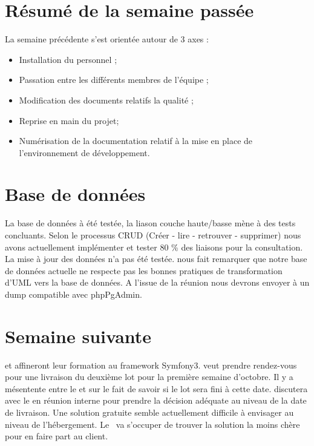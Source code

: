 \documentclass [a4paper] {article}
\begin{document}
\section{Résumé de la semaine passée}
La semaine précédente s'est orientée autour de 3 axes :  
\begin{itemize}
\item Installation du personnel ;
\item Passation entre les différents membres de l'équipe ;
\item Modification des documents relatifs la qualité ;
\item Reprise en main du projet;
\item Numérisation de la documentation relatif à la mise en place de l'environnement de développement.
\end{itemize} 

\section{Base de données}
La base de données à été testée, la liason couche haute/basse mène à des tests concluants. 
Selon le processus CRUD (Créer - lire - retrouver - supprimer) nous avons actuellement implémenter et tester 80 \% des liaisons pour la consultation. La mise à jour des données n'a pas été testée. \nomTuteurPedago{} nous fait remarquer que notre base de données actuelle ne respecte pas les bonnes pratiques de transformation d'UML vers la base de données. A l'issue de la réunion nous devrons envoyer à \nomTuteurPedago{} un dump compatible avec phpPgAdmin.

\section{Semaine suivante}
\Francois{} et\Juliana{} affineront leur formation au framework Symfony3. 
\Pierre{} veut prendre rendez-vous pour une livraison du deuxième lot pour la première semaine d'octobre. Il y a mésentente entre le \RD{} et \Pierre{} sur le fait de savoir si le lot sera fini à cette date. \Pierre discutera avec le \RD{} en réunion interne pour prendre la décision adéquate au niveau de la date de livraison. Une solution gratuite semble actuellement difficile à envisager au niveau de l'hébergement. Le \CP{} va s'occuper de trouver la solution la moins chère pour en faire part au client.
\end{document}
